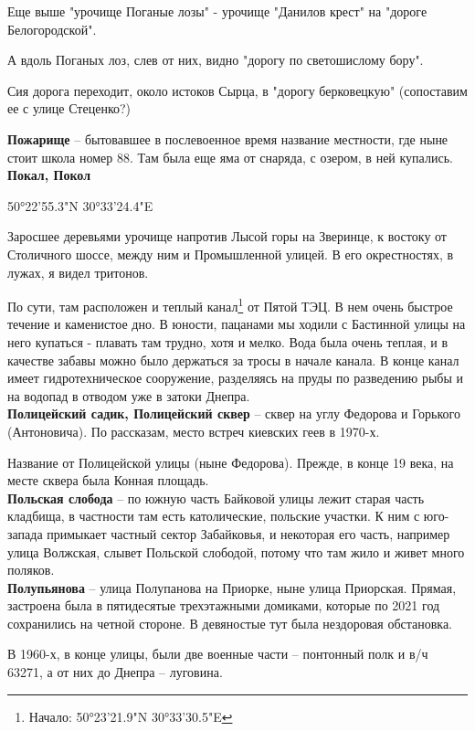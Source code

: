     Еще выше "урочище Поганые лозы" - урочище "Данилов крест" на "дороге Белогородской".

А вдоль Поганых лоз, слев от них, видно "дорогу по светошислому бору".

Сия дорога переходит, около истоков Сырца, в "дорогу берковецкую" (сопоставим ее с улице Стеценко?)


\textbf{Пожарище} – бытовавшее в послевоенное время название местности, где ныне стоит школа номер 88. Там была еще яма от снаряда, с озером, в ней купались.\\

\textbf{Покал, Покол} 

50°22'55.3"N 30°33'24.4"E

Заросшее деревьями урочище напротив Лысой горы на Зверинце, к востоку от Столичного шоссе, между ним и Промышленной улицей. В его окрестностях, в лужах, я видел тритонов.

По сути, там расположен и теплый канал\footnote{Начало: 50°23'21.9"N 30°33'30.5"E} от Пятой ТЭЦ. В нем очень быстрое течение и каменистое дно. В юности, пацанами мы ходили с Бастинной улицы на него купаться - плавать там трудно, хотя и мелко. Вода была очень теплая, и в качестве забавы можно было держаться за тросы в начале канала. В конце канал имеет гидротехническое сооружение, разделяясь на пруды по разведению рыбы и на водопад в отводом уже в затоки Днепра.\\

\textbf{Полицейский садик, Полицейский сквер} – сквер на углу Федорова и Горького (Антоновича). По рассказам, место встреч киевских геев в 1970-х.

Название от Полицейской улицы (ныне Федорова). Прежде, в конце 19 века, на месте сквера была Конная площадь.\\

\textbf{Польская слобода} – по южную часть Байковой улицы лежит старая часть кладбища, в частности там есть католические, польские участки. К ним с юго-запада примыкает частный сектор Забайковья, и некоторая его часть, например улица Волжская, слывет Польской слободой, потому что там жило и живет много поляков.\\

\textbf{Полупьянова} – улица Полупанова на Приорке, ныне улица Приорская. Прямая, застроена была в пятидесятые трехэтажными домиками, которые по 2021 год сохранились на четной стороне. В девяностые тут была нездоровая обстановка.

В 1960-х, в конце улицы, были две военные части – понтонный полк и в/ч 63271, а от них до Днепра – луговина.\\


